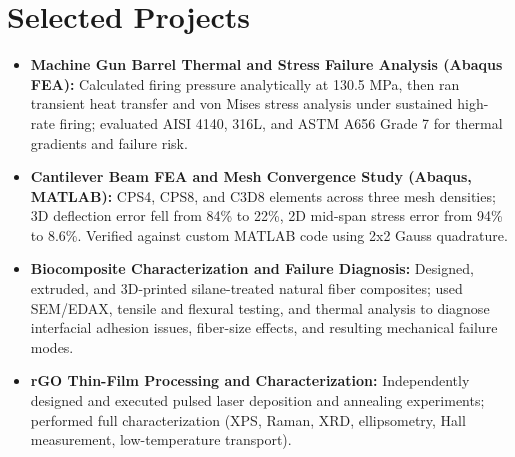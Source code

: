 \documentclass[11pt, letterpaper]{article}
\begin{document}
\section{Selected Projects}
\begin{itemize}
    \item \textbf{Machine Gun Barrel Thermal and Stress Failure Analysis (Abaqus FEA):} Calculated firing pressure analytically at 130.5 MPa, then ran transient heat transfer and von Mises stress analysis under sustained high-rate firing; evaluated AISI 4140, 316L, and ASTM A656 Grade 7 for thermal gradients and failure risk.
    \item \textbf{Cantilever Beam FEA and Mesh Convergence Study (Abaqus, MATLAB):} CPS4, CPS8, and C3D8 elements across three mesh densities; 3D deflection error fell from 84\% to 22\%, 2D mid-span stress error from 94\% to 8.6\%. Verified against custom MATLAB code using 2x2 Gauss quadrature.
    \item \textbf{Biocomposite Characterization and Failure Diagnosis:} Designed, extruded, and 3D-printed silane-treated natural fiber composites; used SEM/EDAX, tensile and flexural testing, and thermal analysis to diagnose interfacial adhesion issues, fiber-size effects, and resulting mechanical failure modes.
    \item \textbf{rGO Thin-Film Processing and Characterization:} Independently designed and executed pulsed laser deposition and annealing experiments; performed full characterization (XPS, Raman, XRD, ellipsometry, Hall measurement, low-temperature transport).
\end{itemize}

\end{document}

